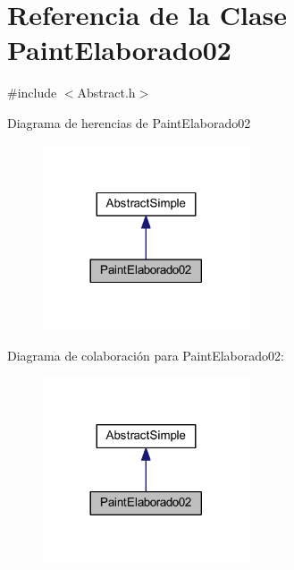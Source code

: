 \hypertarget{class_paint_elaborado02}{}\section{Referencia de la Clase Paint\+Elaborado02}
\label{class_paint_elaborado02}


{\ttfamily \#include $<$Abstract.\+h$>$}



Diagrama de herencias de Paint\+Elaborado02
\nopagebreak
\begin{figure}[H]
\begin{center}
\leavevmode
\includegraphics[width=173pt]{class_paint_elaborado02__inherit__graph}
\end{center}
\end{figure}


Diagrama de colaboración para Paint\+Elaborado02\+:
\nopagebreak
\begin{figure}[H]
\begin{center}
\leavevmode
\includegraphics[width=173pt]{class_paint_elaborado02__coll__graph}
\end{center}
\end{figure}
